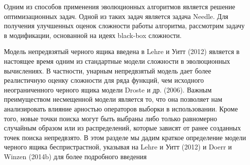 \startprefacepage

Одним из способов применения эволюционных алгоритмов является решение оптимизационных задач. Одной из таких задач является задача Needle. Для получения улучшенных оценок сложности работы алгоритма, рассмотрим задачу в модификации, основанной на идеях black-box сложности.  


  Модель непредвзятый черного ящика введена в Lehre и Уитт (2012) является в настоящее время одним из стандартные модели сложности в эволюционных вычислениях. В частности, унарным непредвзятый модель дает более реалистичную оценку сложности для ряда функций, чем исходного неограниченного черного ящика модели Droste и др. (2006). Важным преимуществом несмещенной модели является то, что она позволяет нам анализировать влияние арностью операторов выборки в использовании. Кроме того, новые точки поиска могут быть выбраны либо только равномерно случайным образом или из распределений, которые зависят от ранее созданных точек поиска непредвзято. В этом разделе мы дадим краткое определение модели черного ящика беспристрастной, указывая на Lehre и Уитт (2012) и Doerr и Winzen (2014b) для более подробного введения
  
  